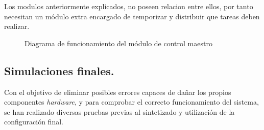 Los modulos anteriormente explicados, no poseen relacion entre ellos, por tanto necesitan un módulo extra encargado de temporizar y distribuir que tareas deben realizar.

\begin{figure}[!hbt]
    \centering
    \scalebox{0.8} {}
    \caption{Diagrama de funcionamiento del módulo de control maestro}
    \label{fig:flujo_main_controller}
\end{figure}

\subsection{Simulaciones finales.}
Con el objetivo de eliminar posibles errores capaces de dañar los propios componentes \emph{hardware}, y para comprobar el correcto funcionamiento del sistema, se han realizado diversas pruebas previas al sintetizado y utilización de la configuración final.

